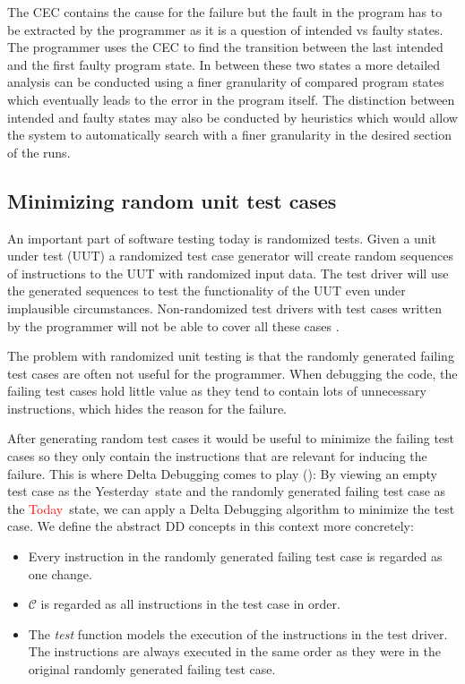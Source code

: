 \documentclass[a4paper,UKenglish]{lipics-v2018}
\newcommand{\green}[1]{\textcolor{td-green}{#1}}
\newcommand{\red}[1]{\textcolor{red}{#1}}
\newcommand{\yd}[0]{\green{Yesterday}}
\newcommand{\td}[0]{\red{Today}}
\newcommand{\C}[0]{\ensuremath{\mathcal{C}}}
\begin{document}
The CEC contains the cause for the failure but the fault in the program has to be extracted by the programmer as it is a question of intended vs faulty states. The programmer uses the CEC to find the transition between the last intended and the first faulty program state. In between these two states a more detailed analysis can be conducted using a finer granularity of compared program states which eventually leads to the error in the program itself. The distinction between intended and faulty states may also be conducted by heuristics which would allow the system to automatically search with a finer granularity in the desired section of the runs.



\subsection{Minimizing random unit test cases}

An important part of software testing today is randomized tests. Given a unit under test (UUT) a randomized test case generator will create random sequences of instructions to the UUT with randomized input data. The test driver will use the generated sequences to test the functionality of the UUT even under implausible circumstances. Non-randomized test drivers with test cases written by the programmer will not be able to cover all these cases \cite{Lei:2005:MRU:1104997.1105255}.

The problem with randomized unit testing is that the randomly generated failing test cases are often not useful for the programmer. When debugging the code, the failing test cases hold little value as they tend to contain lots of unnecessary instructions, which hides the reason for the failure. 

After generating random test cases it would be useful to minimize the failing test cases so they only contain the instructions that are relevant for inducing the failure. This is where Delta Debugging comes to play (\cite{Lei:2005:MRU:1104997.1105255}): By viewing an empty test case as the \yd\ state and the randomly generated failing test case as the \td\ state, we can apply a Delta Debugging algorithm to minimize the test case. We define the abstract DD concepts in this context more concretely:

\begin{itemize}
	\item Every instruction in the randomly generated failing test case is regarded as one change.
	\item $\C$ is regarded as all instructions in the test case in order.
	\item The \textit{test} function models the execution of the instructions in the test driver. The instructions are always executed in the same order as they were in the original randomly generated failing test case. 
\end{itemize}
\end{document}
